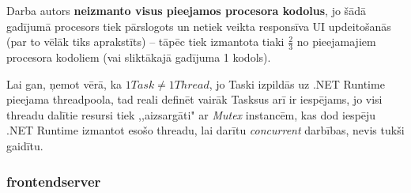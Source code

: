 Darba autors \textbf{neizmanto visus pieejamos procesora kodolus}, jo šādā gadījumā
procesors tiek pārslogots un netiek veikta responsīva UI updeitošanās (par to
vēlāk tiks aprakstīts) -- tāpēc tiek izmantota tiaki \(\frac{2}{3}\) no
pieejamajiem procesora kodoliem (vai sliktākajā gadījuma 1 kodols).

Lai gan, ņemot vērā, ka \(1 Task\neq 1 Thread\), jo Taski izpildās uz .NET Runtime
pieejama threadpoola, tad reali definēt vairāk Tasksus arī ir iespējams, jo visi
threadu dalītie resursi tiek ,,aizsargāti" ar \emph{Mutex}\cite{csharp:mutex} instancēm, kas dod
iespēju .NET Runtime izmantot esošo threadu, lai darītu \emph{concurrent}\cite{csharp:concurrent-parallel} darbības,
nevis tukši gaidītu.


\subsubsection{frontendserver}

